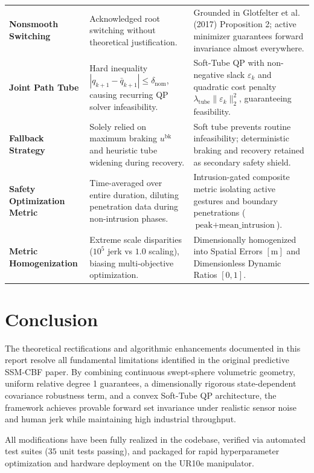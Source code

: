 \documentclass[10pt,twocolumn,a4paper]{article}
\begin{document}
\begin{table}[t!]
\begin{tabular}{p{2.8cm} p{7.3cm} p{7.3cm}}
\addlinespace
\textbf{Nonsmooth Switching} & Acknowledged root switching without theoretical justification. & Grounded in Glotfelter et al. (2017) Proposition 2; active minimizer guarantees forward invariance almost everywhere. \\
\addlinespace
\textbf{Joint Path Tube} & Hard inequality $|q_{k+1} - \bar{q}_{k+1}| \le \delta_{\text{nom}}$, causing recurring QP solver infeasibility. & Soft-Tube QP with non-negative slack $\varepsilon_k$ and quadratic cost penalty $\lambda_{\text{tube}} \|\varepsilon_k\|_2^2$, guaranteeing feasibility. \\
\addlinespace
\textbf{Fallback Strategy} & Solely relied on maximum braking $u^{\text{bk}}$ and heuristic tube widening during recovery. & Soft tube prevents routine infeasibility; deterministic braking and recovery retained as secondary safety shield. \\
\addlinespace
\textbf{Safety Optimization Metric} & Time-averaged over entire duration, diluting penetration data during non-intrusion phases. & Intrusion-gated composite metric isolating active gestures and boundary penetrations ($\text{peak} + \text{mean\_intrusion}$). \\
\addlinespace
\textbf{Metric Homogenization} & Extreme scale disparities ($10^5$ jerk vs $1.0$ scaling), biasing multi-objective optimization. & Dimensionally homogenized into Spatial Errors $[\text{m}]$ and Dimensionless Dynamic Ratios $[0, 1]$. \\
\bottomrule
\end{tabular}
\end{table}

\section{Conclusion}
The theoretical rectifications and algorithmic enhancements documented in this report resolve all fundamental limitations identified in the original predictive SSM-CBF paper. By combining continuous swept-sphere volumetric geometry, uniform relative degree 1 guarantees, a dimensionally rigorous state-dependent covariance robustness term, and a convex Soft-Tube QP architecture, the framework achieves provable forward set invariance under realistic sensor noise and human jerk while maintaining high industrial throughput.

All modifications have been fully realized in the codebase, verified via automated test suites ($35$ unit tests passing), and packaged for rapid hyperparameter optimization and hardware deployment on the UR10e manipulator.
\end{document}
